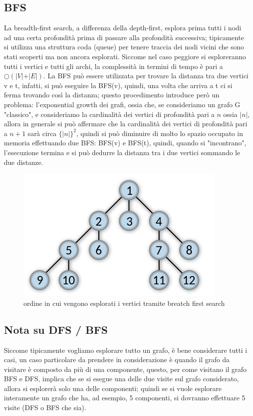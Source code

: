 \documentclass[12pt,a4paper]{article}
\begin{document}
\subsection{BFS}
La breadth-first search, a differenza della depth-first, esplora prima tutti i nodi ad una certa profondità prima di passare alla profondità successiva; tipicamente si utilizza una struttura coda (queue) per tenere traccia dei nodi vicini che sono stati scoperti ma non ancora esplorati. Siccome nel caso peggiore si esploreranno tutti i vertici e tutti gli archi, la complessità in termini di tempo è pari a $\bigcirc(\vert V \vert + \vert E \vert)$. La BFS può essere utilizzata per trovare la distanza tra due vertici v e t, infatti, si può eseguire la BFS(v), quindi, una volta che arriva a t ci si ferma trovando così la distanza; questo procedimento introduce però un problema: l'exponential growth dei grafi, ossia che, se consideriamo un grafo G "classico", e consideriamo la cardinalità dei vertici di profondità pari a $n$ ossia $\vert n \vert$, allora in generale si può affermare che la cardinalità dei vertici di profondità pari a $n+1$ sarà circa ${\lbrace \vert n \vert \rbrace}^{2}$, quindi si può diminuire di molto lo spazio occupato in memoria effettuando due BFS: BFS(v) e BFS(t), quindi, quando si "incontrano", l'esecuzione termina e si può dedurre la distanza tra i due vertici sommando le due distanze.
\begin{figure}[h]
	\centering
	\includegraphics[width=0.7\linewidth]{img/Breadth-first-tree.svg.png}
	\caption{ordine in cui vengono esplorati i vertici tramite breatch first search}
	\label{fig:6}
\end{figure}

\subsection{Nota su DFS / BFS}
Siccome tipicamente vogliamo esplorare tutto un grafo, è bene considerare tutti i casi, un caso particolare da prendere in considerazione è quando il grafo da visitare è composto da più di una componente, questo, per come visitano il grafo BFS e DFS, implica che se si esegue una delle due visite sul grafo considerato, allora si esplorerà solo una delle componenti; quindi se si vuole esplorare interamente un grafo che ha, ad esempio, 5 componenti, si dovranno effettuare 5 visite (DFS o BFS che sia).
\end{document}
